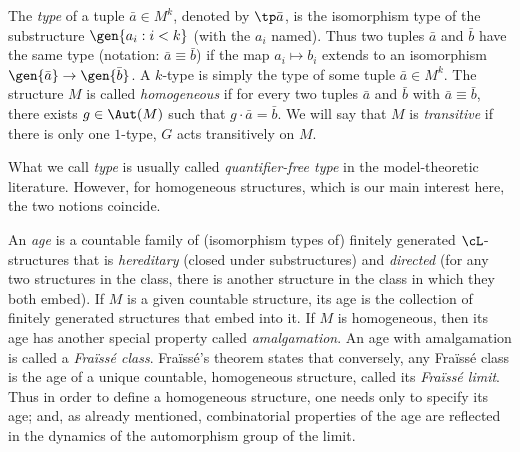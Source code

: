 The \emph{type} of a tuple $\bar a \in M^k$, denoted by $\tp \bar a$, is the isomorphism type of the substructure $\gen{a_i : i < k}$ (with the $a_i$ named). Thus two tuples $\bar a$ and $\bar b$ have the same type (notation: $\bar a \equiv \bar b$) if the map $a_i \mapsto b_i$ extends to an isomorphism $\gen{\bar a} \to\nobreak \gen{\bar b}$. A $k$\nobreakdash-type is simply the type of some tuple $\bar a \in M^k$. The structure $M$ is called \emph{homogeneous} if for every two tuples $\bar a$ and $\bar b$ with $\bar a \equiv \bar b$, there exists $g \in \Aut(M)$ such that $g \cdot \bar a = \bar b$. We will say that $M$ is \emph{transitive} if there is only one $1$-type, \ie $G$ acts transitively on $M$.

What we call \emph{type} is usually called \emph{quantifier-free type} in the model-theoretic literature. However, for homogeneous structures, which is our main interest here, the two notions coincide.\enlargethispage{.5\baselineskip}%

An \emph{age} is a countable family of (isomorphism types of) finitely generated $\cL$\nobreakdash-structures that is \emph{hereditary} (\ie closed under substructures) and \emph{directed} (\ie for any two structures in the class, there is another structure in the class in which they both embed). If $M$ is a given countable structure, its age is the collection of finitely generated structures that embed into it. If $M$ is homogeneous, then its age has another special property called \emph{amalgamation}. An age with amalgamation is called a \emph{Fraïssé class}. Fraïssé's theorem states that conversely, any Fraïssé class is the age of a unique countable, homogeneous structure, called its \emph{Fraïssé limit}. Thus in order to define a homogeneous structure, one needs only to specify its age; and, as already mentioned, combinatorial properties of the age are reflected in the dynamics of the automorphism group of the limit.


